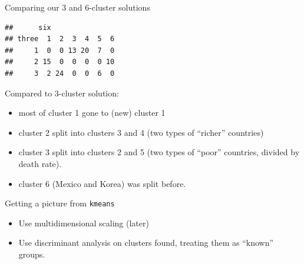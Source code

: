 \documentclass[ignorenonframetext,]{beamer}
\newenvironment{Shaded}{\begin{snugshade}}{\end{snugshade}}
\newcommand{\DataTypeTok}[1]{\textcolor[rgb]{0.13,0.29,0.53}{#1}}
\newcommand{\KeywordTok}[1]{\textcolor[rgb]{0.13,0.29,0.53}{\textbf{#1}}}
\newcommand{\NormalTok}[1]{#1}
\newcommand{\OperatorTok}[1]{\textcolor[rgb]{0.81,0.36,0.00}{\textbf{#1}}}
\begin{document}
\begin{frame}[fragile]{Comparing our 3 and 6-cluster solutions}
\protect\hypertarget{comparing-our-3-and-6-cluster-solutions}{}

\begin{Shaded}
\end{Shaded}

\begin{verbatim}
##      six
## three  1  2  3  4  5  6
##     1  0  0 13 20  7  0
##     2 15  0  0  0  0 10
##     3  2 24  0  0  6  0
\end{verbatim}

Compared to 3-cluster solution:

\begin{itemize}
\item
  most of cluster 1 gone to (new) cluster 1
\item
  cluster 2 split into clusters 3 and 4 (two types of ``richer''
  countries)
\item
  cluster 3 split into clusters 2 and 5 (two types of ``poor''
  countries, divided by death rate).
\item
  cluster 6 (Mexico and Korea) was split before.
\end{itemize}

\end{frame}

\begin{frame}{Getting a picture from \texttt{kmeans}}
\protect\hypertarget{getting-a-picture-from-kmeans}{}

\begin{itemize}
\item
  Use multidimensional scaling (later)
\item
  Use discriminant analysis on clusters found, treating them as
  ``known'' groups.
\end{itemize}

\end{frame}
\end{document}
